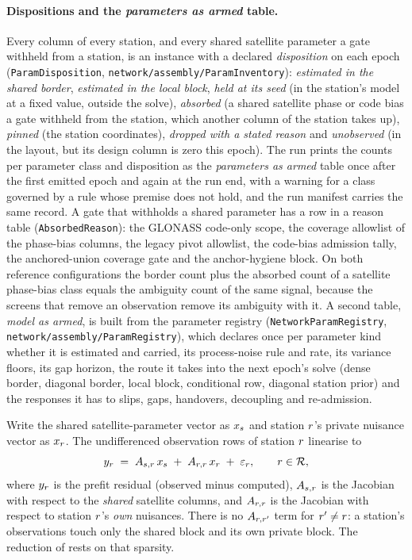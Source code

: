 \documentclass[main.tex]{subfiles}
\begin{document}
\paragraph{Dispositions and the \emph{parameters as armed} table.}
Every column of every station, and every shared satellite parameter a
gate withheld from a station, is an instance with a declared
\emph{disposition} on each epoch
(\texttt{ParamDisposition}, \texttt{network/assembly/ParamInventory}):
\emph{estimated in the shared border}, \emph{estimated in the local
block}, \emph{held at its seed} (in the station's model at a fixed value,
outside the solve), \emph{absorbed} (a shared satellite phase or code
bias a gate withheld from the station, which another column of the
station takes up), \emph{pinned} (the station coordinates), \emph{dropped
with a stated reason} and \emph{unobserved} (in the layout, but its
design column is zero this epoch). The run prints the counts per
parameter class and disposition as the \emph{parameters as armed} table
once after the first emitted epoch and again at the run end, with a
warning for a class governed by a rule whose premise does not hold, and
the run manifest carries the same record. A gate that withholds a shared
parameter has a row in a reason table (\texttt{AbsorbedReason}): the
GLONASS code-only scope, the coverage allowlist of the phase-bias
columns, the legacy pivot allowlist, the code-bias admission tally, the
anchored-union coverage gate and the anchor-hygiene block. On both reference
configurations the border count plus the absorbed count of a satellite
phase-bias class equals the ambiguity count of the same signal, because
the screens that remove an observation remove its ambiguity with it. A second table, \emph{model as
armed}, is built from the parameter registry
(\texttt{NetworkParamRegistry}, \texttt{network/assembly/ParamRegistry}),
which declares once per parameter kind whether it is estimated and
carried, its process-noise rule and rate, its variance floors, its gap
horizon, the route it takes into the next epoch's solve (dense border,
diagonal border, local block, conditional row, diagonal station prior)
and the responses it has to slips, gaps, handovers, decoupling and
re-admission.

Write the shared satellite-parameter vector as $x_s$ and station
$r$'s private nuisance vector as $x_{r}$. The undifferenced
observation rows of station $r$ linearise to
\begin{equation}
y_r \;=\; A_{s,r}\,x_s \;+\; A_{r,r}\,x_{r}
            \;+\; \varepsilon_r,
\qquad r \in \mathcal{R},
\label{eq:net-station-rows}
\end{equation}
where $y_r$ is the prefit residual (observed minus computed),
$A_{s,r}$ is the Jacobian with respect to the \emph{shared}
satellite columns, and $A_{r,r}$ is the Jacobian with respect to
station $r$'s \emph{own} nuisances. There is no
$A_{r,r'}$ term for $r' \neq r$: a station's observations
touch only the shared block and its own private block. The reduction of
 rests on that sparsity.
\end{document}

